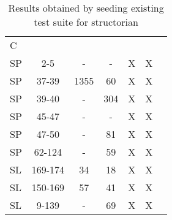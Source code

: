 \begin{table}
\begin{CodeOut}
\begin{center}
\caption {\label{table:rq5}\scriptsize{Results obtained by seeding existing test suite for structorian}}
\begin {tabular} {|l|c|c|c|c|c|c|}
\hline
&&&&&\\ 
\hline
C & \CenterCell{V} &\CenterCell{$N_{Pex}$}&\CenterCell{$Np_{seed}$} &\CenterCell{$N_{eXpress}$} &\CenterCell{$Ne_{seed}$}\\

\hline
SP&2-5&-&-&X&X\\
\hline
SP&37-39&1355&60&X&X\\
\hline
SP&39-40&-&304&X&X\\
\hline
SP&45-47&-&-&X&X\\
\hline
SP&47-50&-&81&X&X\\
\hline
SP&62-124&-&59&X&X\\
\hline
SL&169-174&34&18&X&X\\
\hline
SL&150-169&57&41&X&X\\
\hline
SL&9-139&-&69&X&X\\
\hline
\end{tabular}
\end{center}
\end{CodeOut}
\vspace{- 0.4 in}
\end{table}


